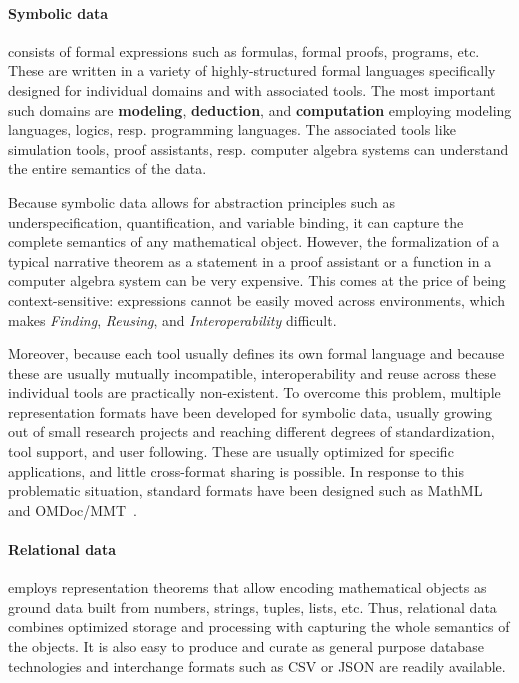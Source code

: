 \paragraph{Symbolic data} consists of formal expressions such as formulas, formal proofs, programs, etc.
These are written in a variety of highly-structured formal languages specifically designed for individual domains and with associated tools.
The most important such domains are \textbf{modeling}, \textbf{deduction}, and \textbf{computation} employing modeling languages, logics, resp. programming languages.
The associated tools like simulation tools, proof assistants, resp. computer algebra systems can understand the entire semantics of the data.

Because symbolic data allows for abstraction principles such as underspecification, quantification, and variable binding, it can capture the complete semantics of any mathematical object.
However, the formalization of a typical narrative theorem as a statement in a proof assistant or a function in a computer algebra system can be very expensive.
This comes at the price of being context-sensitive: expressions cannot be easily moved across environments, which makes \emph{Finding}, \emph{Reusing}, and \emph{Interoperability} difficult.

Moreover, because each tool usually defines its own formal language and because these are usually mutually incompatible, interoperability and reuse across these individual tools are practically non-existent.
To overcome this problem, multiple representation formats have been developed for symbolic data, usually growing out of small research projects and reaching different degrees of standardization, tool support, and user following.
These are usually optimized for specific applications, and little cross-format sharing is possible.
In response to this problematic situation, standard formats have been designed such as MathML~\cite{CarlisleEd:MathML3:on} and OMDoc/MMT~\cite{uniformal:on}.

\paragraph{Relational data} employs representation theorems that allow encoding mathematical objects as ground data built from numbers, strings, tuples, lists, etc.
Thus, relational data combines optimized storage and processing with capturing the whole semantics of the objects.
It is also easy to produce and curate as general purpose database technologies and interchange formats such as CSV or JSON are readily available.

